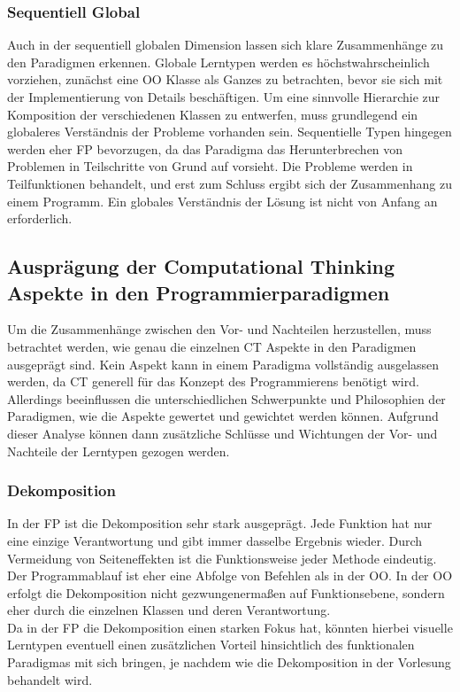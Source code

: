 \subsubsection{Sequentiell Global}
Auch in der sequentiell globalen Dimension lassen sich klare Zusammenhänge zu den Paradigmen erkennen. Globale Lerntypen werden es höchstwahrscheinlich vorziehen, zunächst eine OO Klasse als Ganzes zu betrachten, bevor sie sich mit der Implementierung von Details beschäftigen. Um eine sinnvolle Hierarchie zur Komposition der verschiedenen Klassen zu entwerfen, muss grundlegend ein globaleres Verständnis der Probleme vorhanden sein.
Sequentielle Typen hingegen werden eher FP bevorzugen, da das Paradigma das Herunterbrechen von Problemen in Teilschritte von Grund auf vorsieht. Die Probleme werden in Teilfunktionen behandelt, und erst zum Schluss ergibt sich der Zusammenhang zu einem Programm. Ein globales Verständnis der Lösung ist nicht von Anfang an erforderlich.

\subsection{Ausprägung der Computational Thinking Aspekte in den Programmierparadigmen}
Um die Zusammenhänge zwischen den Vor- und Nachteilen herzustellen, muss betrachtet werden, wie genau die einzelnen CT Aspekte in den Paradigmen ausgeprägt sind. Kein Aspekt kann in einem Paradigma vollständig ausgelassen werden, da CT generell für das Konzept des Programmierens benötigt wird. Allerdings beeinflussen die unterschiedlichen Schwerpunkte und Philosophien der Paradigmen, wie die Aspekte gewertet und gewichtet werden können.
Aufgrund dieser Analyse können dann zusätzliche Schlüsse und Wichtungen der Vor- und Nachteile der Lerntypen gezogen werden.

\subsubsection{Dekomposition}
In der FP ist die Dekomposition sehr stark ausgeprägt. Jede Funktion hat nur eine einzige Verantwortung und gibt immer dasselbe Ergebnis wieder. Durch Vermeidung von Seiteneffekten ist die Funktionsweise jeder Methode eindeutig. Der Programmablauf ist eher eine Abfolge von Befehlen als in der OO. In der OO erfolgt die Dekomposition nicht gezwungenermaßen auf Funktionsebene, sondern eher durch die einzelnen Klassen und deren Verantwortung.
\\
Da in der FP die Dekomposition einen starken Fokus hat, könnten hierbei visuelle Lerntypen eventuell einen zusätzlichen Vorteil hinsichtlich des funktionalen Paradigmas mit sich bringen, je nachdem wie die Dekomposition in der Vorlesung behandelt wird.

